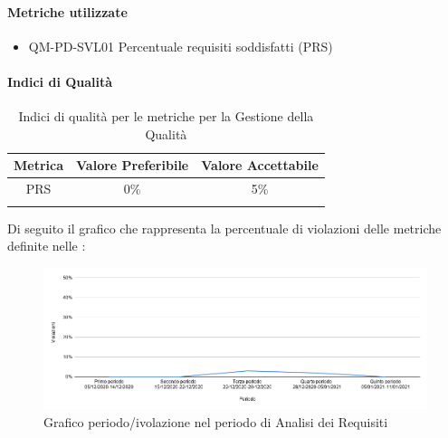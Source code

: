 		\paragraph{Metriche utilizzate}
			\begin{itemize}
				\item QM-PD-SVL01 Percentuale requisiti soddisfatti (PRS) 
			\end{itemize}
			
		\paragraph{Indici di Qualità}
			\begin{center}
				\begin{longtable}{|c|c|c|}
				\hline
				\rowcolor{lighter-grayer}
				\textbf{Metrica} & \textbf{Valore Preferibile} & \textbf{Valore Accettabile}\\
				\hline
				\endfirsthead
				\hline
				PRS & 0\% & 5\% \\
				\hline
				\caption{Indici di qualità per le metriche per la Gestione della Qualità}
				\end{longtable}
			\end{center}

			
			Di seguito il grafico che rappresenta la percentuale di violazioni delle metriche definite nelle :
			
			\begin{figure}[H]
				\centering
				\includegraphics[width=0.9\linewidth]{./res/images/violazioni.png}
				\caption{Grafico periodo/ivolazione nel periodo di Analisi dei Requisiti}
				\label{fig:Grafico violazioni periodo di Analisi dei Requisiti}
			\end{figure}
			
			
			
			
			
			
			
			
			
			
			
			
			
